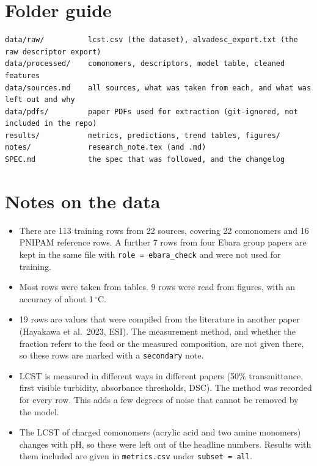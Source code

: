 \documentclass[11pt,a4paper]{article}
\newcommand{\degC}{\ensuremath{^{\circ}}C}
\begin{document}
\section*{Folder guide}

\begin{lstlisting}
data/raw/          lcst.csv (the dataset), alvadesc_export.txt (the raw descriptor export)
data/processed/    comonomers, descriptors, model table, cleaned features
data/sources.md    all sources, what was taken from each, and what was left out and why
data/pdfs/         paper PDFs used for extraction (git-ignored, not included in the repo)
results/           metrics, predictions, trend tables, figures/
notes/             research_note.tex (and .md)
SPEC.md            the spec that was followed, and the changelog
\end{lstlisting}

\section*{Notes on the data}

\begin{itemize}
  \item There are 113 training rows from 22 sources, covering 22 comonomers and 16
  PNIPAM reference rows. A further 7 rows from four Ebara group papers are kept in the
  same file with \texttt{role = ebara\_check} and were not used for training.
  \item Most rows were taken from tables. 9 rows were read from figures, with an
  accuracy of about 1\,\degC.
  \item 19 rows are values that were compiled from the literature in another paper
  (Hayakawa et al.\ 2023, ESI). The measurement method, and whether the fraction refers
  to the feed or the measured composition, are not given there, so these rows are
  marked with a \texttt{secondary} note.
  \item LCST is measured in different ways in different papers (50\% transmittance,
  first visible turbidity, absorbance thresholds, DSC). The method was recorded for
  every row. This adds a few degrees of noise that cannot be removed by the model.
  \item The LCST of charged comonomers (acrylic acid and two amine monomers) changes
  with pH, so these were left out of the headline numbers. Results with them included
  are given in \texttt{metrics.csv} under \texttt{subset = all}.
\end{itemize}
\end{document}
